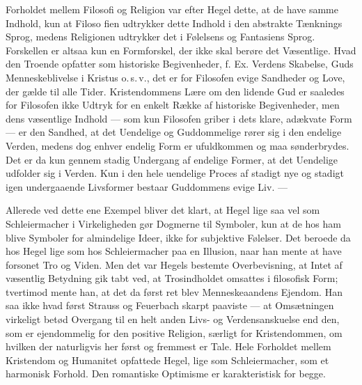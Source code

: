 \documentclass[12pt,a4paper,openany]{book}
\newcommand{\opage}[1]{\marginnote{\footnotesize\textit{[#1]}}}
\begin{document}
Forholdet mellem Filosofi og Religion var efter
Hegel dette, at de have samme Indhold, kun at Filoso%
\opage{12}fien udtrykker dette Indhold i den abstrakte Tænknings
Sprog, medens Religionen udtrykker det i Følelsens og
Fantasiens Sprog. Forskellen er altsaa kun en Formforskel,
der ikke skal berøre det Væsentlige. Hvad den
Troende opfatter som historiske Begivenheder, f. Ex.
Verdens Skabelse, Guds Menneskeblivelse i Kristus o.\,s.\,v.,
det er for Filosofen evige Sandheder og Love, der gælde
til alle Tider. Kristendommens Lære om den lidende
Gud er saaledes for Filosofen ikke Udtryk for en enkelt
Række af historiske Begivenheder, men dens væsentlige
Indhold --- som kun Filosofen griber i dets klare, adækvate
Form --- er den Sandhed, at det Uendelige og
Guddommelige rører sig i den endelige Verden, medens
dog enhver endelig Form er ufuldkommen og maa sønderbrydes.
Det er da kun gennem stadig Undergang af
endelige Former, at det Uendelige udfolder sig i Verden.
Kun i den hele uendelige Proces af stadigt nye og stadigt
igen undergaaende Livsformer bestaar Guddommens evige
Liv. ---

Allerede ved dette ene Exempel bliver det klart, at
Hegel lige saa vel som Schleiermacher i Virkeligheden
gør Dogmerne til Symboler, kun at de hos ham blive
Symboler for almindelige Ideer, ikke for subjektive
Følelser. Det beroede da hos Hegel lige som hos Schleiermacher
paa en Illusion, naar han mente at have forsonet
Tro og Viden. Men det var Hegels bestemte Overbevisning,
at Intet af væsentlig Betydning gik tabt ved, at
Trosindholdet omsattes i filosofisk Form; tvertimod mente
han, at det da først ret blev Menneskeaandens Ejendom.
Han saa ikke hvad først Strauss og Feuerbach skarpt
paaviste --- at Omsætningen virkeligt betød Overgang til
en helt anden Livs- og Verdensanskuelse end den, som
er ejendommelig for den positive Religion, særligt for
Kristendommen, om hvilken der naturligvis her først og
\opage{13}fremmest er Tale. Hele Forholdet mellem Kristendom
og Humanitet opfattede Hegel, lige som Schleiermacher,
som et harmonisk Forhold. Den romantiske Optimisme
er karakteristisk for begge.
\end{document}
